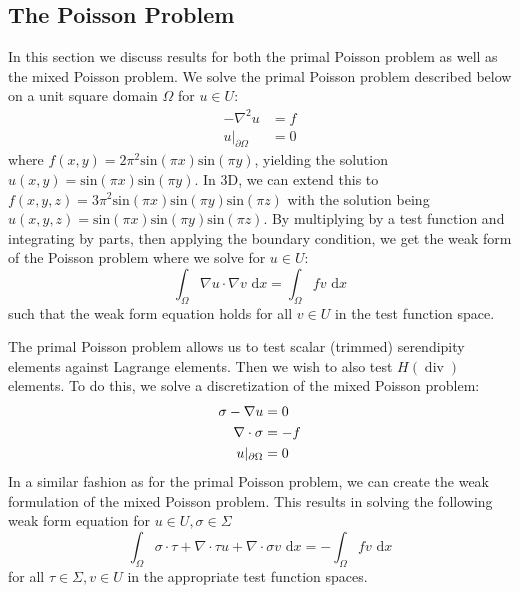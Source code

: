 \documentclass[format=acmsmall,screen,timestamp=false,a4paper]{acmart}
\DeclareMathOperator{\Div}{div}
\newcommand{\hdiv}{\ensuremath{{H}(\Div)}\xspace}
\begin{document}
\subsection{The Poisson Problem}
In this section we discuss results for both the primal Poisson problem as well as the mixed Poisson problem.  We solve the primal Poisson problem described below on a unit square domain $\Omega$ for $u \in U$:
\begin{align*}
    -\nabla^2 u &= f \\
    u\vert_{\partial \Omega} &= 0
\end{align*}
where $f(x,y) = 2\pi^2\text{sin}(\pi x)\text{sin}(\pi y) $, yielding the solution $u(x,y) = \text{sin}(\pi x)\text{sin}(\pi y)$. In 3D, we can extend this to $f(x,y,z) = 3\pi^2\text{sin}(\pi x)\text{sin}(\pi y)\text{sin}(\pi z)$ with the solution being $u(x,y,z) = \text{sin}(\pi x)\text{sin}(\pi y)\text{sin}(\pi z)$.  By multiplying by a test function and integrating by parts, then applying the boundary condition, we get the weak form of the Poisson problem where we solve for $u \in U$:
\begin{equation*}
    \int_\Omega \nabla u \cdot \nabla v \text{ d}x = \int_\Omega f v \text{ d}x
\end{equation*}
such that the weak form equation holds for all $v \in U$ in the test function space.


The primal Poisson problem allows us to test scalar (trimmed) serendipity elements against Lagrange elements.  Then we wish to also test \hdiv elements.  To do this, we solve a discretization of the mixed Poisson problem:
\begin{align}
     \sigma - \nabla u &= 0 \notag \\
     \nabla \cdot \sigma &= -f \notag \\
     u\vert_{\partial \Omega} &= 0 \notag
\end{align}
In a similar fashion as for the primal Poisson problem, we can create the weak formulation of the mixed Poisson problem.  This results in solving the following weak form equation for $u \in U, \sigma \in \Sigma$
\begin{equation*}
    \int_\Omega \sigma \cdot \tau + \nabla \cdot \tau u + \nabla \cdot \sigma v \text{ d}x = - \int_\Omega fv \text{ d}x
\end{equation*}
for all $\tau \in \Sigma, v \in U$ in the appropriate test function spaces.
\end{document}

